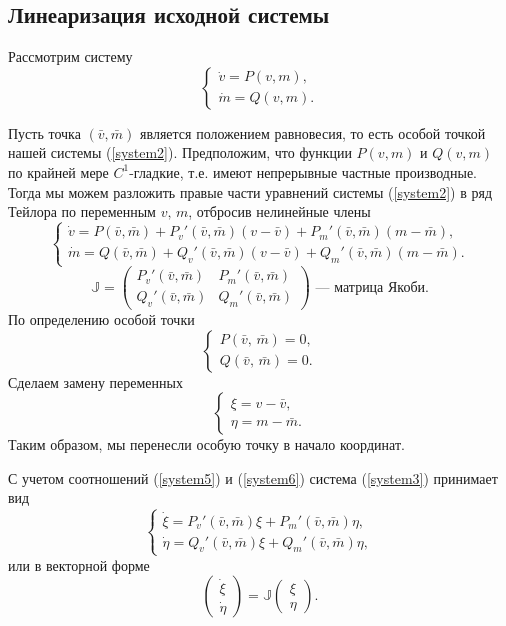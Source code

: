 \documentclass[12pt, a4paper]{article}
\begin{document}
		\subsection{Линеаризация исходной системы}
	Рассмотрим систему
	\begin{equation}
		\begin{cases}
			\dot v=P(v,m),\\
			\dot m=Q(v,m).
			\label{system2}
		\end{cases}
	\end{equation}
	
	Пусть точка $(\bar v,\bar m)$ является положением равновесия, то есть особой точкой нашей системы (\ref{system2}). Предположим, что функции $P(v,m)$ и $Q(v,m)$ по крайней мере $C^1$-гладкие, т.е. имеют непрерывные частные производные. Тогда мы можем разложить правые части уравнений системы (\ref{system2}) в ряд Тейлора по переменным $v,\,m$, отбросив нелинейные члены
	\begin{equation}
\begin{cases}
	\dot v=P(\bar v,\bar m)+P_v'(\bar v,\bar m)(v-\bar v)+P_m'(\bar v,\bar m)(m-\bar m),\\
	\dot m=Q(\bar v,\bar m)+Q_v'(\bar v,\bar m)(v-\bar v)+Q_m'(\bar v,\bar m)(m-\bar m).	
\end{cases}
	\label{system3}
	\end{equation}
\[
	\mathbb{J}=\begin{pmatrix}
	P_v'(\bar v,\bar m) & P_m'(\bar v,\bar m)\\
	Q_v'(\bar v,\bar m) & Q_m'(\bar v,\bar m)
\end{pmatrix}\text{ --- матрица Якоби}.
\]
	По определению особой точки
\begin{equation}
\begin{cases}
	P(\bar v,\,\bar m)=0,\\
	Q(\bar v,\,\bar m)=0.
\end{cases}
\label{system5}
\end{equation}
Сделаем замену переменных
	\begin{equation}
	\begin{cases}
		\xi=v-\bar v,\\
		\eta=m-\bar m.
	\end{cases}
	\label{system6}
\end{equation}
Таким образом, мы перенесли особую точку в начало координат.

С учетом соотношений (\ref{system5}) и (\ref{system6}) система (\ref{system3}) принимает вид
\[
	\begin{cases}
	\dot \xi=P_v'(\bar v,\bar m)\xi+P_m'(\bar v,\bar m)\eta,\\
\dot \eta=Q_v'(\bar v,\bar m)\xi+Q_m'(\bar v,\bar m)\eta,
	\end{cases}
\]
или в векторной форме
\[
\begin{pmatrix}
	\dot \xi\\
	\dot \eta
\end{pmatrix}=
\mathbb{J}
\begin{pmatrix}
	\xi\\
	\eta
\end{pmatrix}.
\]
\end{document}
